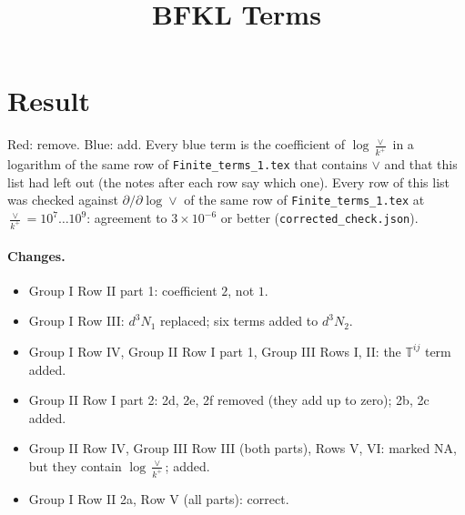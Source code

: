 \documentclass[9pt]{article}
\title{BFKL Terms \new{(corrected)}}
\author{}
\date{}
\newcommand{\new}[1]{{\color{blue}#1}}
\numberwithin{equation}{section}
\begin{document}
\maketitle
\sloppy

\section*{\new{Result}}
\new{Red: remove. Blue: add. Every blue term is the coefficient of $\log\frac{\vee}{k^+}$ in a logarithm of the same row of \texttt{Finite\_terms\_1.tex} that contains $\vee$ and that this list had left out (the notes after each row say which one). Every row of this list was checked against $\partial/\partial\log\vee$ of the same row of \texttt{Finite\_terms\_1.tex} at $\frac{\vee}{k^+}=10^7\dots10^9$: agreement to $3\times10^{-6}$ or better (\texttt{corrected\_check.json}).}

\paragraph{\new{Changes.}}
\begin{itemize}
\item \new{Group I Row II part 1: coefficient $2$, not $1$.}
\item \new{Group I Row III: $d^3N_1$ replaced; six terms added to $d^3N_2$.}
\item \new{Group I Row IV, Group II Row I part 1, Group III Rows I, II: the $\mathbb T^{ij}$ term added.}
\item \new{Group II Row I part 2: 2d, 2e, 2f removed (they add up to zero); 2b, 2c added.}
\item \new{Group II Row IV, Group III Row III (both parts), Rows V, VI: marked NA, but they contain $\log\frac{\vee}{k^+}$; added.}
\item \new{Group I Row II 2a, Row V (all parts): correct.}
\end{itemize}
\end{document}

